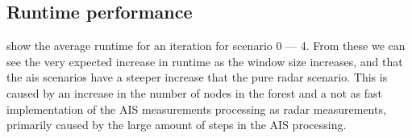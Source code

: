 \subsection{Runtime performance}
 show the average runtime for an iteration for scenario 0 --- 4. From these we can see the very expected increase in runtime as the window size increases, and that the \gls{ais} scenarios have a steeper increase that the pure radar scenario. This is caused by an increase in the number of nodes in the forest and a not as fast implementation of the AIS measurements processing as radar measurements, primarily caused by the large amount of steps in the AIS processing. 